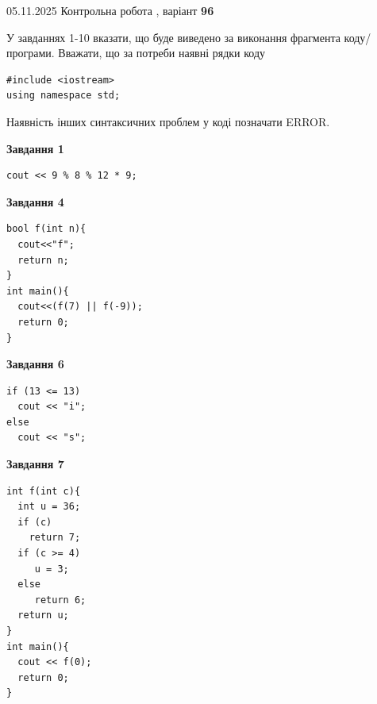 \documentclass[12pt, ukrainian]{article}
\begin{document}
\newpage

{\Large{05.11.2025 Контрольна робота , варіант  \No \textbf { 96 }\par}}
{
\begin {large}
У завданнях 1-10 вказати, що буде виведено за виконання фрагмента коду/про\-гра\-ми.
Вважати, що за потреби наявні рядки коду
\begin{verbatim}
#include <iostream>
using namespace std;
\end{verbatim}
Наявність інших синтаксичних проблем у коді позначати ERROR.

\begin{minipage}[t]{7.0cm}

\begin{center}
\textbf{Завдання 1}
\end{center}
\vspace{-8mm}

\begin{verbatim}
cout << 9 % 8 % 12 * 9;
\end{verbatim}



\begin{center}
\textbf{Завдання 4}
\end{center}
\vspace{-8mm}

\begin{verbatim}
bool f(int n){
  cout<<"f";
  return n;
}
int main(){
  cout<<(f(7) || f(-9));
  return 0;
}
\end{verbatim}



\begin{center}
\textbf{Завдання 6}
\end{center}
\vspace{-8mm}

\begin{verbatim}
if (13 <= 13)
  cout << "i";
else
  cout << "s";
\end{verbatim}



\begin{center}
\textbf{Завдання 7}
\end{center}
\vspace{-8mm}

\begin{verbatim}
int f(int c){
  int u = 36;
  if (c)
    return 7;
  if (c >= 4)
     u = 3;
  else
     return 6;
  return u;
}
int main(){
  cout << f(0);
  return 0;
}
\end{verbatim}


\end{minipage}
\end{large}}
\end{document}
